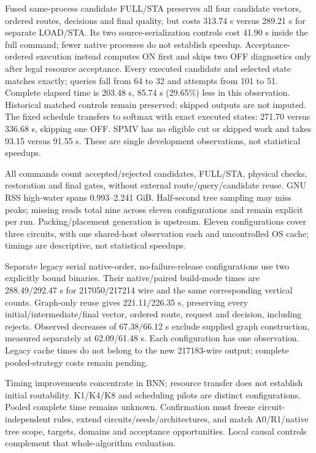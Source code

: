 \documentclass[conference,10pt]{IEEEtran}
\begin{document}
Fused same-process candidate FULL/STA preserves all four candidate vectors, ordered routes, decisions and final quality, but costs 313.74 s versus 289.21 s for separate LOAD/STA. Its two source-serialization controls cost 41.90 s inside the full command; fewer native processes do not establish speedup. Acceptance-ordered execution instead computes ON first and skips two OFF diagnostics only after legal resource acceptance. Every executed candidate and selected state matches exactly; queries fall from 64 to 32 and attempts from 101 to 51. Complete elapsed time is 203.48 s, 85.74 s (29.65\%) less in this observation. Historical matched controls remain preserved; skipped outputs are not imputed. The fixed schedule transfers to softmax with exact executed states: 271.70 versus 336.68 s, skipping one OFF. SPMV has no eligible cut or skipped work and takes 93.15 versus 91.55 s. These are single development observations, not statistical speedups.

All commands count accepted/rejected candidates, FULL/STA, physical checks, restoration and final gates, without external route/query/candidate reuse. GNU RSS high-water spans 0.993--2.241 GiB. Half-second tree sampling may miss peaks; missing reads total nine across eleven configurations and remain explicit per run. Packing/placement generation is upstream. Eleven configurations cover three circuits, with one shared-host observation each and uncontrolled OS cache; timings are descriptive, not statistical speedups.

Separate legacy serial native-order, no-failure-release configurations use two explicitly bound binaries. Their native/paired build-mode times are 288.49/292.47 s for 217050/217214 wire and the same corresponding vertical counts. Graph-only reuse gives 221.11/226.35 s, preserving every initial/intermediate/final vector, ordered route, request and decision, including rejects. Observed decreases of 67.38/66.12 s exclude supplied graph construction, measured separately at 62.09/61.48 s. Each configuration has one observation. Legacy cache times do not belong to the new 217183-wire output; complete pooled-strategy costs remain pending.

Timing improvements concentrate in BNN; resource transfer does not establish initial routability. K1/K4/K8 and scheduling pilots are distinct configurations. Pooled complete time remains unknown. Confirmation must freeze circuit-independent rules, extend circuits/seeds/architectures, and match A0/R1/native tree scope, targets, domains and acceptance opportunities. Local causal controls complement that whole-algorithm evaluation.
\end{document}
